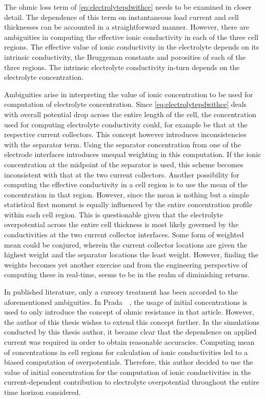 The ohmic  loss term  of \cref{eq:electrolytepdwithce} needs  to be  examined in
closer detail.  The dependence of  this term  on instantaneous load  current and
cell thicknesses  can be accounted  in a straightforward manner.  However, there
are ambiguities  in computing the  effective ionic  conductivity in each  of the
three cell regions. The effective value of ionic conductivity in the electrolyte
depends on its intrinsic conductivity, the Bruggeman constants and porosities of
each  of  the three  regions.  The  intrinsic electrolyte  conductivity  in-turn
depends on the electrolyte concentration.

Ambiguities   arise   in  interpreting   the   value   of  ionic   concentration
to   be    used   for   computation   of    electrolyte   concentration.   Since
\cref{eq:electrolytepdwithce}  deals  with  overall potential  drop  across  the
entire  length of  the cell,  the concentration  used for  computing electrolyte
conductivity could,  for example be  that at the respective  current collectors.
This concept however  introduces inconsistencies with the  separator term. Using
the  separator concentration  from one  of the  electrode interfaces  introduces
unequal  weighting  in this  computation.  If  the  ionic concentration  at  the
midpoint of the separator is used, this scheme becomes inconsistent with that at
the  two current  collectors. Another  possibility for  computing the  effective
conductivity in a  cell region is to  use the mean of the  concentration in that
region. However, since the mean is nothing but a simple statistical first moment
is  equally influenced  by the  entire  concentration profile  within each  cell
region. This is questionable given that the electrolyte overpotential across the
entire cell thickness  is most likely governed by the  conductivities at the two
current  collector interfaces.  Some form  of weighted  mean could  be conjured,
wherein the  current collector locations  are given  the highest weight  and the
separator locations the  least weight. However, finding the  weights becomes yet
another  exercise and  from the  engineering perspective  of computing  these in
real-time, seems to be in the realm of diminishing returns.

In  published  literature,  only  a  cursory  treatment  has  been  accorded  to
the  aforementioned  ambiguities.  In  Prada~\etal~\cite{Prada2012},  the  usage
of  initial concentrations  is  used  to only  introduce  the  concept of  ohmic
resistance  in that  article.  However,  the author  of  this  thesis wishes  to
extend  this  concept further.  In  the  simulations  conducted by  this  thesis
author, it  became clear  that the  dependence on  applied current  was required
in  order to  obtain  reasonable accuracies.  Computing  mean of  concentrations
in  cell  regions for  calculation  of  ionic  conductivities  led to  a  biased
computation of overpotentials.  Therefore, this author decided to  use the value
of  initial concentration  for the  computation of  ionic conductivities  in the
current-dependent  contribution  to  electrolyte  overpotential  throughout  the
entire time horizon considered.

